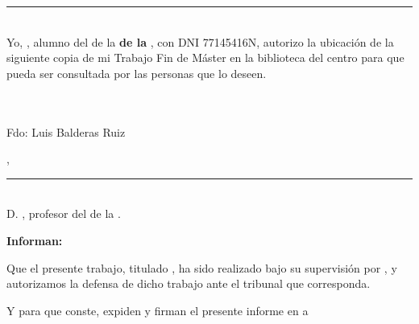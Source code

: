 \documentclass['../proyecto.tex']{memoir}
\begin{document}
\thispagestyle{empty}

\noindent\rule[-1ex]{\textwidth}{2pt}\\[4.5ex]

Yo, \textbf{\AuthorName}, alumno del \Degree de la
\textbf{\FacultyOne de la \University}, con DNI 77145416N, autorizo la
ubicación de la siguiente copia de mi Trabajo Fin de Máster en la
biblioteca del centro para que pueda ser consultada por las personas
que lo deseen.

\vspace{6cm}

\\~\\
\noindent Fdo: Luis Balderas Ruiz

\vspace{2cm}

\begin{flushright}
  \Location, \Time
\end{flushright}

\newpage

\thispagestyle{empty}

\noindent\rule[-1ex]{\textwidth}{2pt}\\[4.5ex]

D. \textbf{\MainProf}, profesor del
\Department de la \University.

\vspace{0.5cm}

\textbf{Informan:}

\vspace{0.5cm}

Que el presente trabajo, titulado \textit{\textbf{\ProjectTitle}}, ha
sido realizado bajo su supervisión por \textbf{\AuthorName}, y
autorizamos la defensa de dicho trabajo ante el tribunal que
corresponda.

\vspace{0.5cm}

Y para que conste, expiden y firman el presente informe en \Location a \Time

\vspace{1cm}

\textbf{\MainProf}

\vspace{5cm}


\newpage
\end{document}
